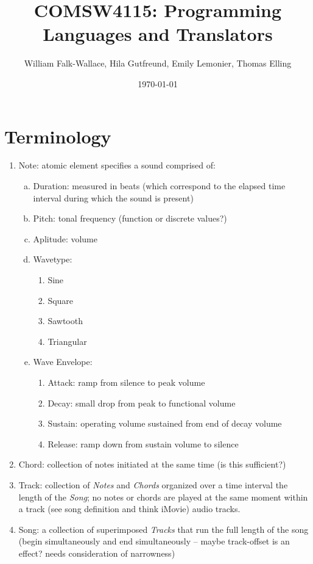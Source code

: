 \documentclass[letterpaper,fleqn,6pt]{article}
\author{William Falk-Wallace, Hila Gutfreund, Emily Lemonier, Thomas Elling}
\title{COMSW4115: Programming Languages and Translators}
\date{\today}
\begin{document}
\maketitle

\section{Terminology}
\begin{enumerate}[1) ]
\item
Note: atomic element specifies a sound comprised of:
\begin{enumerate}[a) ]
\item
Duration: measured in beats (which correspond to the elapsed time interval during which the sound is present)
\item
Pitch: tonal frequency (function or discrete values?)
\item
Aplitude: volume
\item
Wavetype: 
\begin{enumerate}[$\cdot$]
\item Sine
\item Square
\item Sawtooth
\item Triangular
\end{enumerate}
\item
Wave Envelope:
\begin{enumerate}[$\cdot$]
\item Attack: ramp from silence to peak volume
\item Decay: small drop from peak to functional volume
\item Sustain: operating volume sustained from end of decay volume
\item Release: ramp down from sustain volume to silence
\end{enumerate}
\end{enumerate}
\item
Chord: collection of notes initiated at the same time (is this sufficient?)
\item 
Track: collection of \emph{Notes} and \emph{Chords} organized over a time interval the length of the \emph{Song}; no notes or chords are played at the same moment within a track (see song definition and think iMovie) audio tracks.
\item
Song: a collection of superimposed \emph{Tracks} that run the full length of the song (begin simultaneously and end simultaneously -- maybe track-offset is an effect? needs consideration of narrowness)
\end{enumerate}
\end{document}
